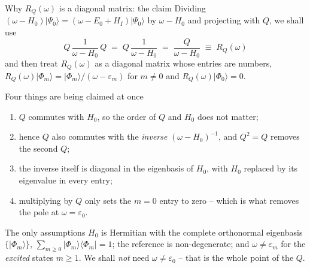 \documentclass[aspectratio=169,10pt]{beamer}
\newcommand{\ket}[1]{\vert #1\rangle}
\newcommand{\ketbra}[2]{\vert #1\rangle\langle #2\vert}
\newcommand{\ph}{\Phi_0}
\newcommand{\Psizero}{\Psi_0}
\begin{document}
\begin{frame}[shrink=8]{Why \(R_Q(\omega)\) is a diagonal matrix: the claim}
Dividing \((\omega-H_0)\ket{\Psizero}=(\omega-E_0+H_I)\ket{\Psizero}\) by \(\omega-H_0\) and projecting with \(Q\), we shall use
\[
\boxed{\;Q\,\frac{1}{\omega-H_0}\,Q \;=\; Q\,\frac{1}{\omega-H_0} \;=\; \frac{Q}{\omega-H_0}\;\equiv\;R_Q(\omega)\;}
\]
and then treat \(R_Q(\omega)\) as a \alert{diagonal matrix} whose entries are numbers,
\(R_Q(\omega)\ket{\Phi_m}=\ket{\Phi_m}/(\omega-\varepsilon_m)\) for \(m\ne0\) and \(R_Q(\omega)\ket{\ph}=0\).
\begin{block}{Four things are being claimed at once}
\begin{enumerate}
\item \(Q\) commutes with \(H_0\), so the order of \(Q\) and \(H_0\) does not matter;
\item hence \(Q\) also commutes with the \emph{inverse} \((\omega-H_0)^{-1}\), and \(Q^2=Q\) removes the second \(Q\);
\item the inverse itself is diagonal in the eigenbasis of \(H_0\), with \(H_0\) replaced by its eigenvalue in every entry;
\item multiplying by \(Q\) only sets the \(m=0\) entry to zero -- which is what removes the pole at \(\omega=\varepsilon_0\).
\end{enumerate}
\end{block}
\begin{alertblock}{The only assumptions}
\(H_0\) is Hermitian with the complete orthonormal eigenbasis \(\{\ket{\Phi_m}\}\), \(\sum_{m\ge0}\ketbra{\Phi_m}{\Phi_m}=1\); the reference is non-degenerate; and \(\omega\ne\varepsilon_m\) for the \emph{excited} states \(m\ge1\). We shall \emph{not} need \(\omega\ne\varepsilon_0\) -- that is the whole point of the \(Q\).
\end{alertblock}
\end{frame}
\end{document}
